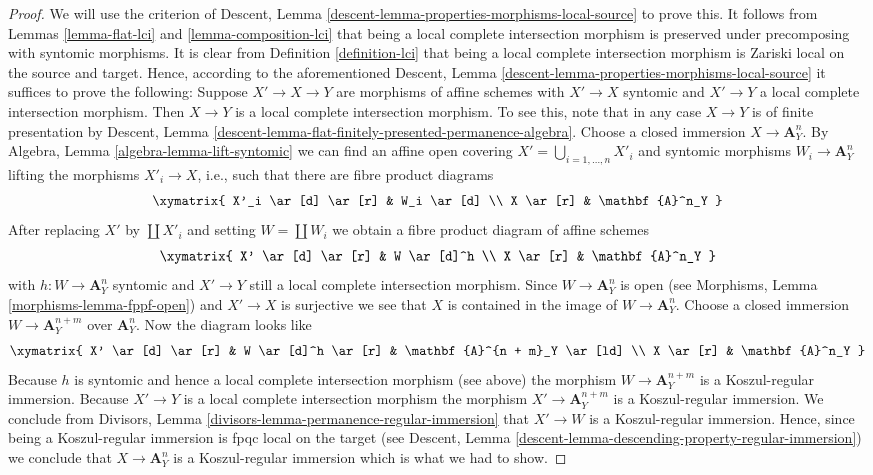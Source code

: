 \begin{proof}
We will use the criterion of
Descent, Lemma \ref{descent-lemma-properties-morphisms-local-source}
to prove this. It follows from
Lemmas \ref{lemma-flat-lci} and
\ref{lemma-composition-lci}
that being a local complete intersection morphism is preserved under
precomposing with syntomic morphisms. It is clear from
Definition \ref{definition-lci}
that being a local complete intersection morphism is Zariski local on the
source and target. Hence, according to the aforementioned
Descent, Lemma \ref{descent-lemma-properties-morphisms-local-source}
it suffices to prove the following: Suppose $X' \to X \to Y$ are
morphisms of affine schemes with $X' \to X$ syntomic and $X' \to Y$
a local complete intersection morphism. Then $X \to Y$ is a local complete
intersection morphism. To see this, note that in any case $X \to Y$ is of
finite presentation by
Descent, Lemma \ref{descent-lemma-flat-finitely-presented-permanence-algebra}.
Choose a closed immersion $X \to \mathbf{A}^n_Y$. By
Algebra, Lemma \ref{algebra-lemma-lift-syntomic}
we can find an affine open covering $X' = \bigcup_{i = 1, \ldots, n} X'_i$
and syntomic morphisms $W_i \to \mathbf{A}^n_Y$ lifting the morphisms
$X'_i \to X$, i.e., such that there are fibre product diagrams
$$
\xymatrix{
X'_i \ar[d] \ar[r] & W_i \ar[d] \\
X \ar[r] & \mathbf{A}^n_Y
}
$$
After replacing $X'$ by $\coprod X'_i$ and setting $W = \coprod W_i$
we obtain a fibre product diagram of affine schemes
$$
\xymatrix{
X' \ar[d] \ar[r] & W \ar[d]^h \\
X \ar[r] & \mathbf{A}^n_Y
}
$$
with $h : W \to \mathbf{A}^n_Y$ syntomic and $X' \to Y$ still a local complete
intersection morphism. Since $W \to \mathbf{A}^n_Y$ is open (see
Morphisms, Lemma \ref{morphisms-lemma-fppf-open})
and $X' \to X$ is surjective we see that $X$ is contained in the image
of $W \to \mathbf{A}^n_Y$. Choose a closed immersion
$W \to \mathbf{A}^{n + m}_Y$ over $\mathbf{A}^n_Y$. Now the diagram looks like
$$
\xymatrix{
X' \ar[d] \ar[r] & W \ar[d]^h \ar[r] & \mathbf{A}^{n + m}_Y \ar[ld] \\
X \ar[r] & \mathbf{A}^n_Y
}
$$
Because $h$ is syntomic and hence a local complete intersection morphism (see
above) the morphism $W \to \mathbf{A}^{n + m}_Y$ is a Koszul-regular immersion.
Because $X' \to Y$ is a local complete intersection morphism the morphism
$X' \to \mathbf{A}^{n + m}_Y$ is a Koszul-regular immersion. We conclude from
Divisors, Lemma \ref{divisors-lemma-permanence-regular-immersion}
that $X' \to W$ is a Koszul-regular immersion. Hence, since being
a Koszul-regular immersion is fpqc local on the target (see
Descent, Lemma \ref{descent-lemma-descending-property-regular-immersion})
we conclude that $X \to \mathbf{A}^n_Y$ is a Koszul-regular immersion
which is what we had to show.
\end{proof}

